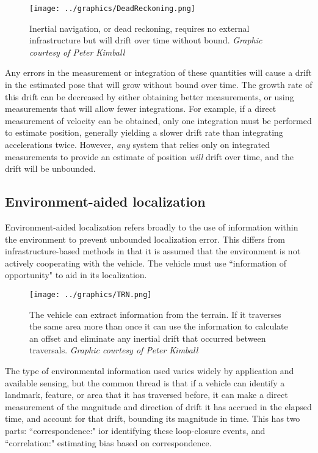 \begin{figure}[htbp]
   \centering
   \texttt{[image: ../graphics/DeadReckoning.png]} %
   \caption{Inertial navigation, or dead reckoning, requires no external infrastructure but will drift over time without bound. \emph{Graphic courtesy of Peter Kimball}}
   \label{fig:inertialNav}
\end{figure}

Any errors in the measurement or integration of these quantities will cause a drift in the estimated pose that will grow without bound over time. The growth rate of this drift can be decreased by either obtaining better measurements, or using measurements that will allow fewer integrations. For example, if a direct measurement of velocity can be obtained, only one integration must be performed to estimate position, generally yielding a slower drift rate than integrating accelerations twice. However, \emph{any} system that relies only on integrated measurements to provide an estimate of position \emph{will} drift over time, and the drift will be unbounded. 

\subsection{Environment-aided localization}

Environment-aided localization refers broadly to the use of information within the environment to prevent unbounded localization error. This differs from infrastructure-based methods in that it is assumed that the environment is not actively cooperating with the vehicle. The vehicle must use ``information of opportunity" to aid in its localization. 

\begin{figure}[htbp]
   \centering
   \texttt{[image: ../graphics/TRN.png]} %
   \caption{The vehicle can extract information from the terrain. If it traverses the same area more than once it can use the information to calculate an offset and eliminate any inertial drift that occurred between traversals. \emph{Graphic courtesy of Peter Kimball}}
   \label{fig:TRN}
\end{figure}

The type of environmental information used varies widely by application and available sensing, but the common thread is that if a vehicle can identify a landmark, feature, or area that it has traversed before, it can make a direct measurement of the magnitude and direction of drift it has accrued in the elapsed time, and account for that drift, bounding its magnitude in time. This has two parts: ``correspondence:" ior identifying these loop-closure events, and ``correlation:" estimating bias based on correspondence. 

